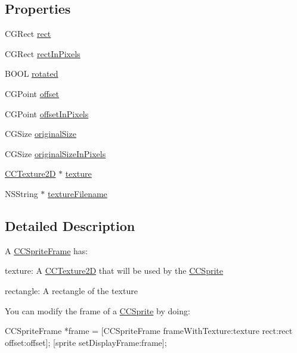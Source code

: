 \subsection*{Properties}
\begin{DoxyCompactItemize}
\item 
C\-G\-Rect \hyperlink{interface_c_c_sprite_frame_a7c5eb9c09bca5b2dac1a5d2c988affdb}{rect}
\item 
C\-G\-Rect \hyperlink{interface_c_c_sprite_frame_a0b1ba9e7d49cfa23b120828b8dc1dfea}{rect\-In\-Pixels}
\item 
B\-O\-O\-L \hyperlink{interface_c_c_sprite_frame_a53892235ea1f843c39d9be3eaea3a05c}{rotated}
\item 
C\-G\-Point \hyperlink{interface_c_c_sprite_frame_a383201c46dfdbc911fe46356e1b86909}{offset}
\item 
C\-G\-Point \hyperlink{interface_c_c_sprite_frame_ac1b194686a75ffafffbc9ea2cc2a4f7c}{offset\-In\-Pixels}
\item 
C\-G\-Size \hyperlink{interface_c_c_sprite_frame_a63da85f3fe5646803a2d403896b3c762}{original\-Size}
\item 
C\-G\-Size \hyperlink{interface_c_c_sprite_frame_a7ec8a93d1aa970d2b0f9574874e8df48}{original\-Size\-In\-Pixels}
\item 
\hyperlink{class_c_c_texture2_d}{C\-C\-Texture2\-D} $\ast$ \hyperlink{interface_c_c_sprite_frame_a0241dc02a4432faa4652116169a80510}{texture}
\item 
N\-S\-String $\ast$ \hyperlink{interface_c_c_sprite_frame_a39ae0d4d63eac89d6d5b9d9d433046f2}{texture\-Filename}
\end{DoxyCompactItemize}


\subsection{Detailed Description}
A \hyperlink{interface_c_c_sprite_frame}{C\-C\-Sprite\-Frame} has\-:
\begin{DoxyItemize}
\item texture\-: A \hyperlink{class_c_c_texture2_d}{C\-C\-Texture2\-D} that will be used by the \hyperlink{class_c_c_sprite}{C\-C\-Sprite}
\item rectangle\-: A rectangle of the texture
\end{DoxyItemize}

You can modify the frame of a \hyperlink{class_c_c_sprite}{C\-C\-Sprite} by doing\-: \begin{DoxyVerb}   CCSpriteFrame *frame = [CCSpriteFrame frameWithTexture:texture rect:rect offset:offset];
   [sprite setDisplayFrame:frame];\end{DoxyVerb}
 

